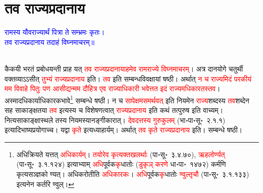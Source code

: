 \section[तव राज्यप्रदानाय]{तव राज्यप्रदानाय}
\centering\textcolor{blue}{रामस्य यौवराज्यार्थं पित्रा ते सम्भ्रमः कृतः।\nopagebreak\\
तव राज्यप्रदानाय तदाहं विघ्नमाचरम्॥}\nopagebreak\\
\\
\begin{sloppypar}\justifying\noindent\hspace{10mm} कैकयी भरतं प्रबोधयन्ती प्राह यत् \textcolor{red}{तव राज्य\-प्रदानायाहमेव राम\-राज्ये विघ्नमाचरम्‌}। अत्र दानयोगे चतुर्थी वक्तव्याऽऽसीत् \textcolor{red}{तुभ्यं राज्य\-प्रदानाय} इति। \textcolor{red}{तव} इति सम्बन्ध\-विवक्षायां षष्ठी। अर्थात् \textcolor{red}{न च राज्यमिदं परकीयं मम विवाहे पितुः पण आसीद्यन्मम दौहित्र एव राज्याधिकारी भवेत्तत इदं राज्यमधिकारतस्तव}। अस्मादधि\-कार्याधि\-कारक\-भावे\footnote{अधिक्रियते यत्तत् \textcolor{red}{अधिकार्यम्‌}। \textcolor{red}{तयोरेव कृत्यक्तखलर्थाः} (पा॰सू॰~३.४.७०), \textcolor{red}{ऋहलोर्ण्यत्‌} (पा॰सू॰~३.१.१२४) इत्याभ्याम् \textcolor{red}{अधि}पूर्वक\textcolor{red}{कृ}धातोः (\textcolor{red}{डुकृञ् करणे} धा॰पा॰~१४७२) कर्मणि कृत्यसञ्ज्ञको ण्यत्। अधिकरोतीति \textcolor{red}{अधिकारकः}। \textcolor{red}{अधि}पूर्वक\textcolor{red}{कृ}धातोः \textcolor{red}{ण्वुल्तृचौ} (पा॰सू॰~३.१.१३३) इत्यनेन कर्तरि ण्वुल्।} सम्बन्धे षष्ठी। न च \textcolor{red}{सापेक्षमसमर्थवत्‌} इति नियमेन \textcolor{red}{राज्य}\-शब्दस्य \textcolor{red}{तव}\-शब्देन सह साकाङ्क्षतया \textcolor{red}{तव} इत्यस्य च विशेषणत्वात् \textcolor{red}{राज्य\-प्रदानाय} इति कथं तत्पुरुष इति वाच्यम्। नित्य\-साकाङ्क्षा\-स्थले तस्य नियमस्यानङ्गीकारात्। \textcolor{red}{देवदत्तस्य गुरु\-कुलम्‌} (भा॰पा॰सू॰~२.१.१) इत्यादि\-भाष्य\-प्रयोगाच्च। यद्वा \textcolor{red}{कृते} इत्यध्याहार्यम्।
अर्थात् \textcolor{red}{तव कृते राज्य\-प्रदानाय} इति। सम्बन्धे षष्ठी।\end{sloppypar}
